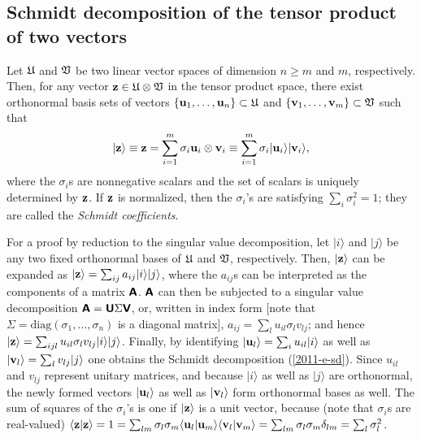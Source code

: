 \subsection{Schmidt decomposition of the tensor product of two vectors}
\label{2011-m-Schmidtdecomposition}

Let  ${\frak U}$  and   ${\frak V}$ be
two linear vector spaces
of dimension $n\ge m$ and $m$, respectively.
Then, for any vector
${\bf z} \in {\frak U}\otimes {\frak V}$
in the tensor product space,
there exist
orthonormal basis sets of vectors
$\{ {\bf u}_1, \ldots ,{\bf u}_n \}  \subset  {\frak U}$
and
$\{ {\bf v}_1, \ldots ,{\bf v}_m \}  \subset  {\frak V}$
such that
\begin{equation}
\vert {\bf z}\rangle \equiv {\bf z}=\sum_{i=1}^m
\sigma_i  {\bf u}_i \otimes  {\bf v}_i
\equiv
\sum_{i=1}^m \sigma_i   \vert {\bf u}_i  \rangle  \vert {\bf v}_i  \rangle,
\label{2011-e-sd}
\end{equation}
where the $\sigma_i$s are nonnegative scalars and the set of scalars is uniquely determined by
${\bf z}$.
If $  {\bf z}$
is normalized, then the  $\sigma_i$'s are  satisfying
$\sum_i \sigma_i^2=1$;
they are called the
{\em Schmidt coefficients}.


{\color{OliveGreen}
\bproof
For a proof by reduction to the singular value decomposition,
let
$\vert i\rangle$
and
$\vert j\rangle$
be any two fixed orthonormal bases of $ {\frak U}$ and $ {\frak V}$, respectively.
Then,
$\vert {\bf z}\rangle $
can be expanded as
$\vert {\bf z}\rangle  = \sum_{ij}a_{ij} \vert i\rangle \vert j\rangle$,
where the $a_{ij}$s can be interpreted as the components of a matrix
$\textsf{\textbf{A}}$.
$\textsf{\textbf{A}}$ can then be subjected to a
singular value decomposition
$\textsf{\textbf{A}} = \textsf{\textbf{U}} \Sigma \textsf{\textbf{V}}$,
or, written in index form [note that $\Sigma=\textrm{diag}(\sigma_1, \ldots, \sigma_n)$ is a diagonal matrix],
$a_{ij}= \sum_l u_{il}\sigma_l v_{lj}$;
and hence  $\vert {\bf z}\rangle  = \sum_{ijl} u_{il}\sigma_l v_{lj}\vert i\rangle \vert j\rangle$.
Finally, by identifying
$\vert {\bf u}_l  \rangle = \sum_i u_{il} \vert i\rangle$
as well as
$\vert {\bf v}_l  \rangle = \sum_l v_{lj} \vert j\rangle$
one obtains the Schmidt decomposition (\ref{2011-e-sd}).
Since $u_{il}$ and $v_{ lj}$ represent unitary matrices,
and because
 $\vert i\rangle$ as well as
 $\vert j\rangle$
are orthonormal,
the newly formed vectors
$\vert {\bf u}_l \rangle$
as well as
$\vert {\bf v}_l  \rangle$
form orthonormal bases as well.
The sum of squares of the $\sigma_i$'s is one if  $\vert {\bf z}\rangle $ is a unit vector,
because  (note that $\sigma_i$s are real-valued)
 $\langle {\bf z}\vert {\bf z}\rangle =1
=   \sum_{lm} \sigma_l \sigma_m   \langle {\bf u}_l  \vert  {\bf u}_m  \rangle   \langle  {\bf v}_l  \vert  {\bf v}_m  \rangle
=   \sum_{lm} \sigma_l \sigma_m  \delta_{lm}
=   \sum_{l} \sigma_l^2
$.
\eproof
}

